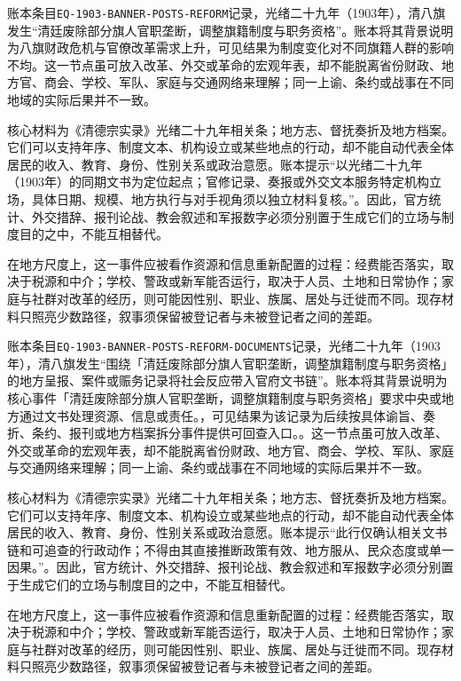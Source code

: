 账本条目\texttt{EQ-1903-BANNER-POSTS-REFORM}记录，光绪二十九年（1903年），清八旗发生“清廷废除部分旗人官职垄断，调整旗籍制度与职务资格”。账本将其背景说明为八旗财政危机与官僚改革需求上升，可见结果为制度变化对不同旗籍人群的影响不均。这一节点虽可放入改革、外交或革命的宏观年表，却不能脱离省份财政、地方官、商会、学校、军队、家庭与交通网络来理解；同一上谕、条约或战事在不同地域的实际后果并不一致。

核心材料为《清德宗实录》光绪二十九年相关条；地方志、督抚奏折及地方档案。它们可以支持年序、制度文本、机构设立或某些地点的行动，却不能自动代表全体居民的收入、教育、身份、性别关系或政治意愿。账本提示“以光绪二十九年（1903年）的同期文书为定位起点；官修记录、奏报或外交文本服务特定机构立场，具体日期、规模、地方执行与对手视角须以独立材料复核。”。因此，官方统计、外交措辞、报刊论战、教会叙述和军报数字必须分别置于生成它们的立场与制度目的之中，不能互相替代。

在地方尺度上，这一事件应被看作资源和信息重新配置的过程：经费能否落实，取决于税源和中介；学校、警政或新军能否运行，取决于人员、土地和日常协作；家庭与社群对改革的经历，则可能因性别、职业、族属、居处与迁徙而不同。现存材料只照亮少数路径，叙事须保留被登记者与未被登记者之间的差距。

账本条目\texttt{EQ-1903-BANNER-POSTS-REFORM-DOCUMENTS}记录，光绪二十九年（1903年），清八旗发生“围绕「清廷废除部分旗人官职垄断，调整旗籍制度与职务资格」的地方呈报、案件或赈务记录将社会反应带入官府文书链”。账本将其背景说明为核心事件「清廷废除部分旗人官职垄断，调整旗籍制度与职务资格」要求中央或地方通过文书处理资源、信息或责任。，可见结果为该记录为后续按具体谕旨、奏折、条约、报刊或地方档案拆分事件提供可回查入口。。这一节点虽可放入改革、外交或革命的宏观年表，却不能脱离省份财政、地方官、商会、学校、军队、家庭与交通网络来理解；同一上谕、条约或战事在不同地域的实际后果并不一致。

核心材料为《清德宗实录》光绪二十九年相关条；地方志、督抚奏折及地方档案。它们可以支持年序、制度文本、机构设立或某些地点的行动，却不能自动代表全体居民的收入、教育、身份、性别关系或政治意愿。账本提示“此行仅确认相关文书链和可追查的行政动作；不得由其直接推断政策有效、地方服从、民众态度或单一因果。”。因此，官方统计、外交措辞、报刊论战、教会叙述和军报数字必须分别置于生成它们的立场与制度目的之中，不能互相替代。

在地方尺度上，这一事件应被看作资源和信息重新配置的过程：经费能否落实，取决于税源和中介；学校、警政或新军能否运行，取决于人员、土地和日常协作；家庭与社群对改革的经历，则可能因性别、职业、族属、居处与迁徙而不同。现存材料只照亮少数路径，叙事须保留被登记者与未被登记者之间的差距。

